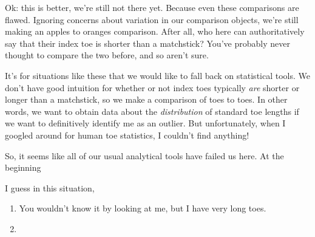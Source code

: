 \documentclass{fkpset}
\begin{document}
\begin{solution}[Outline.]
  Ok: this is better, we're still not there yet. Because even these comparisons
  are flawed. Ignoring concerns about variation in our comparison objects, we're
  still making an apples to oranges comparison. After all, who here can
  authoritatively say that their index toe is shorter than a matchstick? You've
  probably never thought to compare the two before, and so aren't sure.


  It's for situations like these that we would like to fall back on statistical
  tools. We don't have good intuition for whether or not index toes typically
  \emph{are} shorter or longer than a matchstick, so we make a comparison of
  toes to toes. In other words, we want to obtain data about the
  \emph{distribution} of standard toe lengths if we want to definitively
  identify me as an outlier. But unfortunately, when I googled around for human
  toe statistics, I couldn't find anything!

  So, it seems like all of our usual analytical tools have failed us here. At
  the beginning

  I
  guess in this situation,



  \begin{enumerate}
    \item You wouldn't know it by looking at me, but I have very long toes.
    \item
  \end{enumerate}

\end{solution}
\end{document}
